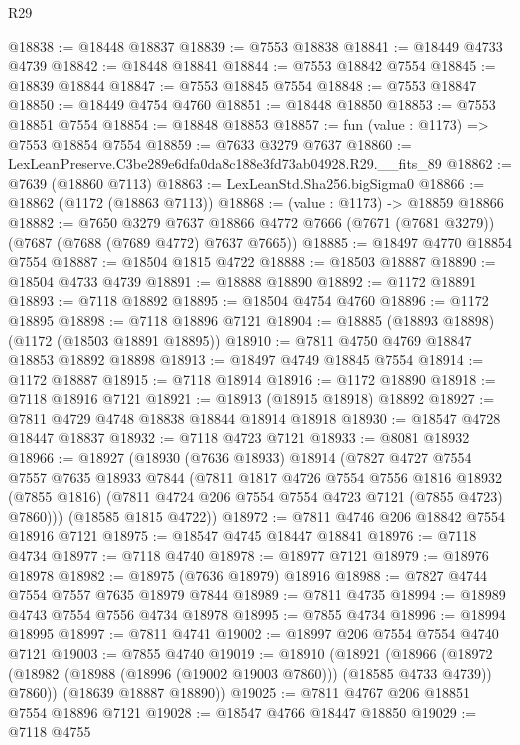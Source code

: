 \begin{lexlean}{R29}
\begin{coremodule}
@18838 := @18448 @18837
@18839 := @7553 @18838
@18841 := @18449 @4733 @4739
@18842 := @18448 @18841
@18844 := @7553 @18842 @7554
@18845 := @18839 @18844
@18847 := @7553 @18845 @7554
@18848 := @7553 @18847
@18850 := @18449 @4754 @4760
@18851 := @18448 @18850
@18853 := @7553 @18851 @7554
@18854 := @18848 @18853
@18857 := fun (value : @1173) => @7553 @18854 @7554
@18859 := @7633 @3279 @7637
@18860 := LexLeanPreserve.C3be289e6dfa0da8c188e3fd73ab04928.R29.__fits_89
@18862 := @7639 (@18860 @7113)
@18863 := LexLeanStd.Sha256.bigSigma0
@18866 := @18862 (@1172 (@18863 @7113))
@18868 := (value : @1173) -> @18859 @18866
@18882 := @7650
    @3279
    @7637
    @18866
    @4772
    @7666
    (@7671 (@7681 @3279))
    (@7687 (@7688 (@7689 @4772) @7637 @7665))
@18885 := @18497 @4770 @18854 @7554
@18887 := @18504 @1815 @4722
@18888 := @18503 @18887
@18890 := @18504 @4733 @4739
@18891 := @18888 @18890
@18892 := @1172 @18891
@18893 := @7118 @18892
@18895 := @18504 @4754 @4760
@18896 := @1172 @18895
@18898 := @7118 @18896 @7121
@18904 := @18885 (@18893 @18898) (@1172 (@18503 @18891 @18895))
@18910 := @7811 @4750 @4769 @18847 @18853 @18892 @18898
@18913 := @18497 @4749 @18845 @7554
@18914 := @1172 @18887
@18915 := @7118 @18914
@18916 := @1172 @18890
@18918 := @7118 @18916 @7121
@18921 := @18913 (@18915 @18918) @18892
@18927 := @7811 @4729 @4748 @18838 @18844 @18914 @18918
@18930 := @18547 @4728 @18447 @18837
@18932 := @7118 @4723 @7121
@18933 := @8081 @18932
@18966 := @18927
    (@18930
      (@7636 @18933)
      @18914
      (@7827
        @4727
        @7554
        @7557
        @7635
        @18933
        @7844
        (@7811
          @1817
          @4726
          @7554
          @7556
          @1816
          @18932
          (@7855 @1816)
          (@7811 @4724 @206 @7554 @7554 @4723 @7121 (@7855 @4723) @7860)))
      (@18585 @1815 @4722))
@18972 := @7811 @4746 @206 @18842 @7554 @18916 @7121
@18975 := @18547 @4745 @18447 @18841
@18976 := @7118 @4734
@18977 := @7118 @4740
@18978 := @18977 @7121
@18979 := @18976 @18978
@18982 := @18975 (@7636 @18979) @18916
@18988 := @7827 @4744 @7554 @7557 @7635 @18979 @7844
@18989 := @7811 @4735
@18994 := @18989 @4743 @7554 @7556 @4734 @18978
@18995 := @7855 @4734
@18996 := @18994 @18995
@18997 := @7811 @4741
@19002 := @18997 @206 @7554 @7554 @4740 @7121
@19003 := @7855 @4740
@19019 := @18910
    (@18921
      (@18966 (@18972 (@18982 (@18988 (@18996 (@19002 @19003 @7860))) (@18585 @4733 @4739)) @7860))
      (@18639 @18887 @18890))
@19025 := @7811 @4767 @206 @18851 @7554 @18896 @7121
@19028 := @18547 @4766 @18447 @18850
@19029 := @7118 @4755

\end{coremodule}
\end{lexlean}
